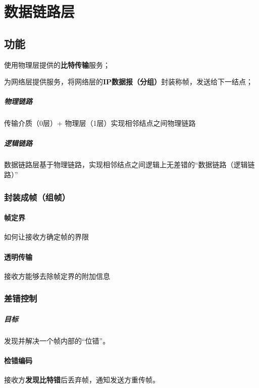 
\chapter{数据链路层}

\section{功能}

使用物理层提供的\textbf{比特传输}服务；

为网络层提供服务，将网络层的\textbf{IP数据报（分组）}封装称帧，发送给下一结点；


\paragraph{物理链路}
传输介质（0层）+ 物理层（1层）实现相邻结点之间物理链路

\paragraph{逻辑链路}
数据链路层基于物理链路，实现相邻结点之间逻辑上无差错的“数据链路（逻辑链路）”


\subsection{封装成帧（组帧）}

\subsubsection{帧定界}
如何让接收方确定帧的界限


\subsubsection{透明传输}
接收方能够去除帧定界的附加信息



\subsection{差错控制}

\paragraph{目标}
发现并解决一个帧内部的“位错”。


\subsubsection{检错编码}
接收方\textbf{发现比特错}后丢弃帧，通知发送方重传帧。

